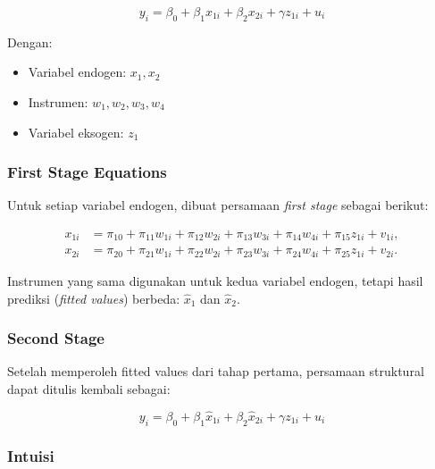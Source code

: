 \documentclass[]{article}
\begin{document}
\begin{equation}
y_i = \beta_{0} + \beta_{1} x_{1i} + \beta_{2} x_{2i} + \gamma z_{1i} + u_i
\end{equation}

\noindent
Dengan:
\begin{itemize}
    \item Variabel endogen: $x_{1}, x_{2}$
    \item Instrumen: $w_{1}, w_{2}, w_{3}, w_{4}$
    \item Variabel eksogen: $z_{1}$
\end{itemize}

\subsubsection*{First Stage Equations}

Untuk setiap variabel endogen, dibuat persamaan \textit{first stage} sebagai berikut:

\begin{align}
x_{1i} &= \pi_{10} + \pi_{11} w_{1i} + \pi_{12} w_{2i} + \pi_{13} w_{3i} + \pi_{14} w_{4i} + \pi_{15} z_{1i} + v_{1i}, \\
x_{2i} &= \pi_{20} + \pi_{21} w_{1i} + \pi_{22} w_{2i} + \pi_{23} w_{3i} + \pi_{24} w_{4i} + \pi_{25} z_{1i} + v_{2i}.
\end{align}

\noindent
Instrumen yang sama digunakan untuk kedua variabel endogen, tetapi hasil prediksi (\textit{fitted values}) berbeda: $\hat{x}_{1}$ dan $\hat{x}_{2}$.

\subsubsection*{Second Stage}

Setelah memperoleh fitted values dari tahap pertama, persamaan struktural dapat ditulis kembali sebagai:

\begin{equation}
y_i = \beta_{0} + \beta_{1} \hat{x}_{1i} + \beta_{2} \hat{x}_{2i} + \gamma z_{1i} + u_i
\end{equation}

\subsubsection*{Intuisi}
\end{document}
